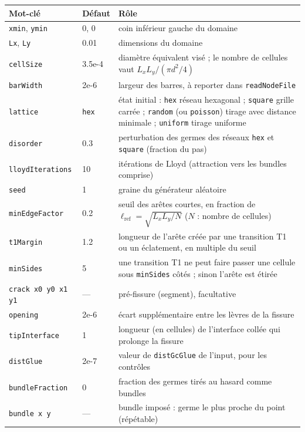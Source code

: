 \documentclass[11pt,a4paper]{article}
\newcommand{\code}[1]{\texttt{#1}}
\begin{document}
\begin{center}
\small
\begin{tabular}{@{}llp{9.4cm}@{}}
  \toprule
  Mot-clé & Défaut & Rôle \\
  \midrule
  \code{xmin}, \code{ymin} & 0, 0 & coin inférieur gauche du domaine \\
  \code{Lx}, \code{Ly} & 0.01 & dimensions du domaine \\
  \code{cellSize} & 3.5e-4 & diamètre équivalent visé ; le nombre de cellules vaut $L_xL_y/(\pi d^2/4)$ \\
  \code{barWidth} & 2e-6 & largeur des barres, à reporter dans \code{readNodeFile} \\
  \midrule
  \code{lattice} & \code{hex} & état initial : \code{hex} réseau hexagonal ; \code{square} grille carrée ;
    \code{random} (ou \code{poisson}) tirage avec distance minimale ; \code{uniform} tirage uniforme \\
  \code{disorder} & 0.3 & perturbation des germes des réseaux \code{hex} et \code{square} (fraction du pas) \\
  \code{lloydIterations} & 10 & itérations de Lloyd (attraction vers les bundles comprise) \\
  \code{seed} & 1 & graine du générateur aléatoire \\
  \midrule
  \code{minEdgeFactor} & 0.2 & seuil des arêtes courtes, en fraction de $\ell_{\text{ref}}=\sqrt{L_xL_y/N}$
    ($N$ : nombre de cellules) \\
  \code{t1Margin} & 1.2 & longueur de l'arête créée par une transition T1 ou un éclatement, en multiple du seuil \\
  \code{minSides} & 5 & une transition T1 ne peut faire passer une cellule sous \code{minSides} côtés ;
    sinon l'arête est étirée \\
  \midrule
  \code{crack x0 y0 x1 y1} & --- & pré-fissure (segment), facultative \\
  \code{opening} & 2e-6 & écart supplémentaire entre les lèvres de la fissure \\
  \code{tipInterface} & 1 & longueur (en cellules) de l'interface collée qui prolonge la fissure \\
  \code{distGlue} & 2e-7 & valeur de \code{distGcGlue} de l'input, pour les contrôles \\
  \midrule
  \code{bundleFraction} & 0 & fraction des germes tirés au hasard comme bundles \\
  \code{bundle x y} & --- & bundle imposé : germe le plus proche du point (répétable) \\

\end{tabular}
\end{center}
\end{document}
